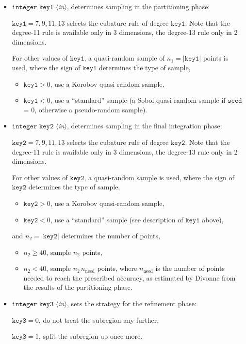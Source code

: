 \documentclass[12pt]{article}
\newcommand\nneed{n_{\text{need}}}
\newcommand\Code[1]{\ensuremath{\texttt{#1}}}
\newcommand\VarIn[1]{\item\Code{#1} \textit{$\langle$in\/$\rangle$},}
\begin{document}
\begin{itemize}
\VarIn{integer key1}
determines sampling in the partitioning phase:

$\Code{key1} = 7, 9, 11, 13$ selects the cubature rule of degree 
\Code{key1}.  Note that the degree-11 rule is available only in 3
dimensions, the degree-13 rule only in 2 dimensions.

For other values of \Code{key1}, a quasi-random sample of
$n_1 = |\Code{key1}|$ points is used, where the sign of \Code{key1}
determines the type of sample,
\begin{itemize}
\item
$\Code{key1} > 0$, use a Korobov quasi-random sample,
\item
$\Code{key1} < 0$, use a ``standard'' sample
(a Sobol quasi-random sample if \Code{seed} = 0, otherwise a
pseudo-random sample).
\end{itemize}

\VarIn{integer key2}
determines sampling in the final integration phase:

$\Code{key2} = 7, 9, 11, 13$ selects the cubature rule of degree 
\Code{key2}.  Note that the degree-11 rule is available only in 3
dimensions, the degree-13 rule only in 2 dimensions.

For other values of \Code{key2}, a quasi-random sample is used, where 
the sign of \Code{key2} determines the type of sample,
\begin{itemize}
\item
$\Code{key2} > 0$, use a Korobov quasi-random sample,
\item
$\Code{key2} < 0$, use a ``standard'' sample (see description of 
\Code{key1} above),
\end{itemize}
and $n_2 = |\Code{key2}|$ determines the number of points,
\begin{itemize}
\item
$n_2\geqslant 40$, sample $n_2$ points,
\item
$n_2 < 40$, sample $n_2\,\nneed$ points, where $\nneed$ is the number of
points needed to reach the prescribed accuracy, as estimated by Divonne 
from the results of the partitioning phase.
\end{itemize}

\VarIn{integer key3}
sets the strategy for the refinement phase:

$\Code{key3} = 0$, do not treat the subregion any further.

$\Code{key3} = 1$, split the subregion up once more.


\end{itemize}
\end{document}
